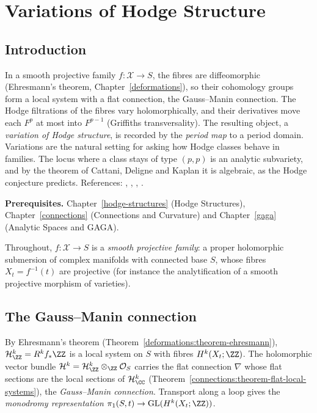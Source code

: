 \chapter{Variations of Hodge Structure}\label{vhs}

\section{Introduction}\label{vhs:section-introduction}

In a smooth projective family $f \colon \mathcal{X} \to S$, the fibres are diffeomorphic (Ehresmann's theorem, Chapter~\ref{deformations}), so their cohomology groups form a local system with a flat
connection, the Gauss--Manin connection. The Hodge filtrations of the fibres vary holomorphically, and their derivatives move each $F^p$ at most into $F^{p-1}$
(Griffiths transversality). The resulting object, a \emph{variation of Hodge structure}, is recorded by the \emph{period map} to a period domain. Variations
are the natural setting for asking how Hodge classes behave in families. The locus where a class stays of type $(p,p)$ is an analytic subvariety, and by the theorem
of Cattani, Deligne and Kaplan it is algebraic, as the Hodge conjecture predicts. References: \cite[Chapters 9 and 10]{voisin-hodge-1}, \cite{voisin-hodge-2},
\cite{carlson-muller-stach-peters}, \cite{griffiths-periods}.

\noindent\textbf{Prerequisites.} Chapter~\ref{hodge-structures} (Hodge Structures), Chapter~\ref{connections} (Connections and Curvature) and Chapter~\ref{gaga}
(Analytic Spaces and GAGA).

Throughout, $f \colon \mathcal{X} \to S$ is a \emph{smooth projective family}: a proper holomorphic submersion of complex manifolds with connected base $S$, whose fibres
$X_t = f^{-1}(t)$ are projective (for instance the analytification of a smooth projective morphism of varieties).

\section{The Gauss--Manin connection}\label{vhs:section-gauss-manin}

\begin{definition}\label{vhs:definition-gauss-manin}
By Ehresmann's theorem (Theorem~\ref{deformations:theorem-ehresmann}), $\mathcal{H}^k_\ZZ = R^kf_*\ZZ$ is a local system on $S$ with fibres $H^k(X_t; \ZZ)$. The holomorphic vector bundle $\mathcal{H}^k = \mathcal{H}^k_\ZZ \otimes_\ZZ\mathcal{O}_S$ carries the
flat connection $\nabla$ whose flat sections are the local sections of $\mathcal{H}^k_\CC$ (Theorem~\ref{connections:theorem-flat-local-systems}), the \emph{Gauss--Manin connection}. Transport
along a loop gives the \emph{monodromy representation} $\pi_1(S, t) \to \mathrm{GL}(H^k(X_t; \ZZ))$.
\end{definition}

